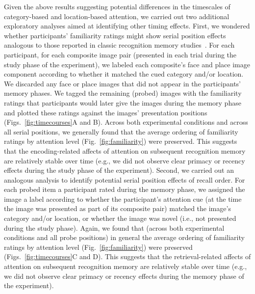 \documentclass[english]{article}
\begin{document}
Given the above results suggesting potential differences in the timescales of
category-based and location-based attention, we carried out two additional
exploratory analyses aimed at identifying other timing effects. First, we
wondered whether participants' familiarity ratings might show serial position
effects analogous to those reported in classic recognition memory
studies~\citep[e.g.,][]{Neat93b, McElDosh89, WickNorm66}. For each participant,
for each composite image pair (presented in each trial during the study phase
of the experiment), we labeled each composite's face and place image component
according to whether it matched the cued category and/or location. We discarded
any face or place images that did not appear in the participants' memory
phases. We tagged the remaining (probed) images with the familiarity ratings
that participants would later give the images during the memory phase and
plotted these ratings against the images' presentation positions
(Figs.~\ref{fig:timecourses}A and B). Across both experimental conditions and
across all serial positions, we generally found that the average ordering of
familiarity ratings by attention level (Fig.~\ref{fig:familiarity}) were
preserved. This suggests that the encoding-related affects of attention on
subsequent recognition memory are relatively stable over time (e.g., we did not
observe clear primacy or recency effects during the study phase of the
experiment). Second, we carried out an analogous analysis to identify potential
serial position effects of recall order. For each probed item a participant
rated during the memory phase, we assigned the image a label according to
whether the participant's attention cue (at the time the image was presented as
part of its composite pair) matched the image's category and/or location, or
whether the image was novel (i.e., not presented during the study phase).
Again, we found that (across both experimental conditions and all probe
positions) in general the average ordering of familiarity ratings by attention
level (Fig.~\ref{fig:familiarity}) were preserved (Figs.~\ref{fig:timecourses}C
and D). This suggests that the retrieval-related affects of attention on
subsequent recognition memory are relatively stable over time (e.g., we did not
observe clear primacy or recency effects during the memory phase of the
experiment).
\end{document}

